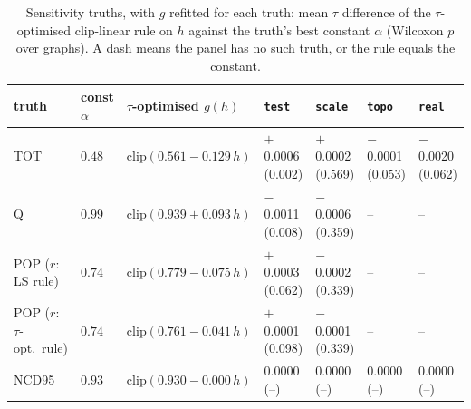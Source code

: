 \begin{table}[!htbp]
\centering
\footnotesize\setlength{\tabcolsep}{4pt}
\caption{Sensitivity truths, with $g$ refitted for each truth: mean $\tau$ difference of the $\tau$-optimised clip-linear rule on $h$ against the truth's best constant $\alpha$ (Wilcoxon $p$ over graphs). A dash means the panel has no such truth, or the rule equals the constant.}
\label{tab:sens}
\begin{tabular}{@{}lllllll@{}}
\toprule
truth & const $\alpha$ & $\tau$-optimised $g(h)$ & \texttt{test} & \texttt{scale} & \texttt{topo} & \texttt{real} \\
\midrule
TOT & $0.48$ & $\mathrm{clip}(0.561-0.129\,h)$ & $+$0.0006 (0.002) & $+$0.0002 (0.569) & $-$0.0001 (0.053) & $-$0.0020 (0.062) \\
Q & $0.99$ & $\mathrm{clip}(0.939+0.093\,h)$ & $-$0.0011 (0.008) & $-$0.0006 (0.359) & -- & -- \\
POP ($r$: LS rule) & $0.74$ & $\mathrm{clip}(0.779-0.075\,h)$ & $+$0.0003 (0.062) & $-$0.0002 (0.339) & -- & -- \\
POP ($r$: $\tau$-opt.\ rule) & $0.74$ & $\mathrm{clip}(0.761-0.041\,h)$ & $+$0.0001 (0.098) & $-$0.0001 (0.339) & -- & -- \\
NCD95 & $0.93$ & $\mathrm{clip}(0.930-0.000\,h)$ & 0.0000 (--) & 0.0000 (--) & 0.0000 (--) & 0.0000 (--) \\
\bottomrule
\end{tabular}
\end{table}

